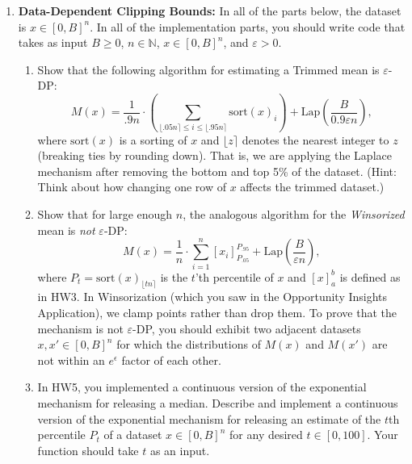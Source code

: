 \documentclass[11pt]{article}
\theoremstyle{plain}
\theoremstyle{definition}
\theoremstyle{solution}
\newcommand{\sort}{\mathrm{sort}}
\begin{document}
\begin{enumerate}[leftmargin=*]
\item \textbf{Data-Dependent Clipping Bounds:} In all of the parts below, the dataset is $x\in [0,B]^n$.   In all of the implementation parts, you should write
code that takes as input $B\geq 0$, $n\in\mathbb{N}$, $x\in [0,B]^n$, and $\varepsilon>0$.

\begin{enumerate}
\item Show that the following algorithm for estimating a Trimmed mean is $\varepsilon$-DP:
$$M(x) = \frac{1}{.9n}\cdot \left(\sum_{\lfloor .05n \rceil\leq i \leq \lfloor .95n \rceil} \sort(x)_i\right) +\mathrm{Lap}\left(\frac{B}{0.9\varepsilon n}\right),$$
where $\sort(x)$ is a sorting of $x$ and $\lfloor z\rceil$ denotes the nearest integer to $z$ (breaking ties by rounding down).  That is, we are applying the Laplace mechanism after removing the bottom and top 5\% of the dataset.
(Hint: Think about how changing one row of $x$ affects the trimmed dataset.)
\label{part:TrimLap}

\item Show that for large enough $n$, the analogous algorithm for the {\em Winsorized} mean is {\em not} $\varepsilon$-DP:
$$M(x) = \frac{1}{n}\cdot \sum_{i=1}^n \left[x_i\right]_{P_{.05}}^{P_{.95}} +\mathrm{Lap}\left(\frac{B}{\varepsilon n}\right),$$
where $P_t = \sort(x)_{\lfloor tn\rceil}$ is the $t$'th percentile of $x$ and $[x]_a^b$ is defined as in HW3.
In Winsorization (which you saw in the Opportunity Insights Application), we clamp points rather than drop them. 
To prove that the mechanism is not $\varepsilon$-DP, you should exhibit two adjacent datasets $x,x'\in [0,B]^n$ for
which the distributions of $M(x)$ and $M(x')$ are not within an $e^{\epsilon}$ factor of each other. \label{part:Winsorized}

\item In HW5, you implemented a continuous version of the exponential mechanism for releasing a median.  Describe and implement a continuous version of the exponential mechanism for releasing an estimate
of the $t$th percentile $P_t$ of a dataset $x\in [0,B]^n$
for any desired $t\in [0,100]$. Your function should take $t$ as an input. \label{part:percentile} 


\iffalse
\item Implement the following $\varepsilon$-DP algorithm for estimating a Trimmed mean of a dataset: use your algorithm from Part~\ref{part:percentile} to get  $\varepsilon/3$-DP estimates
$\hat{P}_{.05}$ and $\hat{P}_{.95}$ of the 5th and 95th percentiles, drop all datapoints that lie outside the range $[\hat{P}_{.05},\hat{P}_{.95}]$, and then use the Laplace mechanism to compute an $(\varepsilon/3)$-DP mean of the trimmed data.  That is, your code should compute 
$$M(x) = \frac{1}{.9n}\cdot \left(\sum_{i : \hat{P}_{.05}\leq x_i \leq \hat{P}_{.95}} x_i\right)
+ \mathrm{Lap}\left(\frac{3(\hat{P}_{.95}-\hat{P}_{.05})}{0.9\varepsilon n}\right).$$
\label{part:ExpTrimLap}
\fi


\end{enumerate}
\end{enumerate}
\end{document}
